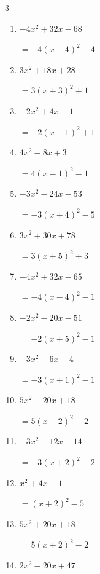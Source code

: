 \begin{multicols}{3}
\begin{enumerate}
        $=-4\left( x+5\right)^{2}-3$

  \item $-4x^{2}+32x-68$

        $=-4\left( x-4\right)^{2}-4$

  \item $3x^{2}+18x+28$

        $=3\left( x+3\right)^{2}+1$

  \item $-2x^{2}+4x-1$

        $=-2\left( x-1\right)^{2}+1$

  \item $4x^{2}-8x+3$

        $=4\left( x-1\right)^{2}-1$

  \item $-3x^{2}-24x-53$

        $=-3\left( x+4\right)^{2}-5$

  \item $3x^{2}+30x+78$

        $=3\left( x+5\right)^{2}+3$

  \item $-4x^{2}+32x-65$

        $=-4\left( x-4\right)^{2}-1$

  \item $-2x^{2}-20x-51$

        $=-2\left( x+5\right)^{2}-1$

\columnbreak %

\resetques

  \item $-3x^{2}-6x-4$

        $=-3\left( x+1\right)^{2}-1$

  \item $5x^{2}-20x+18$

        $=5\left( x-2\right)^{2}-2$

  \item $-3x^{2}-12x-14$

        $=-3\left( x+2\right)^{2}-2$

  \item $x^{2}+4x-1$

        $=\left( x+2\right)^{2}-5$

  \item $5x^{2}+20x+18$

        $=5\left( x+2\right)^{2}-2$

  \item $2x^{2}-20x+47$


\end{enumerate}
\end{multicols}
